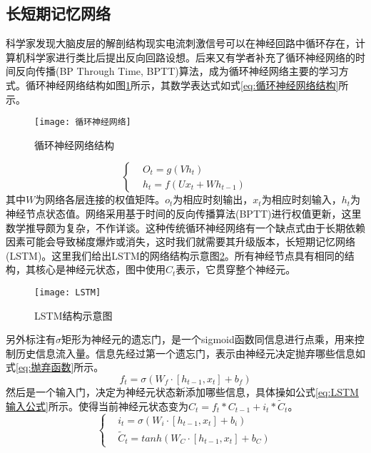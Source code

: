 \subsection{长短期记忆网络}
科学家发现大脑皮层的解剖结构现实电流刺激信号可以在神经回路中循环存在，计算机科学家进行类比后提出反向回路设想。后来又有学者补充了循环神经网络的时间反向传播(BP Through Time, BPTT)算法，成为循环神经网络主要的学习方式。循环神经网络结构如图\ref{fig:循环神经网络}所示，其数学表达式如式\ref{eq:循环神经网络结构}所示。
\begin{figure}[h]
	\centering
	\texttt{[image: 循环神经网络]}
	\caption{循环神经网络结构}
	\label{fig:循环神经网络}
\end{figure}
\begin{equation}\label{eq:循环神经网络结构}
\left\lbrace 
\begin{aligned}
&O_{t}=g\left ( Vh_{t} \right )\\
&h_{t}=f\left ( Ux_{t} + Wh_{t-1} \right )
\end{aligned}
\right.
\end{equation}
其中$W$为网络各层连接的权值矩阵。$o_{t}$为相应时刻输出，$x_{t}$为相应时刻输入，$h_{t}$为神经节点状态值。网络采用基于时间的反向传播算法(BPTT)进行权值更新，这里数学推导颇为复杂，不作详谈。这种传统循环神经网络有一个缺点式由于长期依赖因素可能会导致梯度爆炸或消失，这时我们就需要其升级版本，长短期记忆网络(LSTM)。这里我们给出LSTM的网络结构示意图\ref{fig:LSTM示意图}。所有神经节点具有相同的结构，其核心是神经元状态，图中使用$C_{t}$表示，它贯穿整个神经元。
\begin{figure}[h]
	\centering
	\texttt{[image: LSTM]}
	\caption{LSTM结构示意图}
	\label{fig:LSTM示意图}
\end{figure}
另外标注有$\sigma$矩形为神经元的遗忘门，是一个sigmoid函数同信息进行点乘，用来控制历史信息流入量。信息先经过第一个遗忘门，表示由神经元决定抛弃哪些信息如式\ref{eq:抛弃函数}所示。
\begin{equation}\label{eq:抛弃函数}
f_{t}=\sigma\left ( W_{f} \cdot \left [ h_{t-1},x_{t} \right ]+b_{f}\right )
\end{equation}
然后是一个输入门，决定为神经元状态新添加哪些信息，具体操如公式\ref{eq:LSTM输入公式}所示。使得当前神经元状态变为$C_{t}=f_{t}*C_{t-1}+i_{t}*\tilde{C}_{t}$。
\begin{equation}\label{eq:LSTM输入公式}
\left\lbrace 
\begin{aligned}
&i_{t}=\sigma \left ( W_{i} \cdot \left [ h_{t-1},x_{t} \right ] +b_{i}\right )\\
&\tilde{C}_{t}=tanh\left ( W_{C} \cdot \left [ h_{t-1},x_{t} \right ] +b_{C}\right )
\end{aligned}
\right.
\end{equation}
